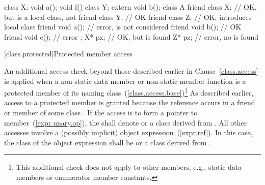 \begin{codeblock}
class X;
void a();
void f() {
  class Y;
  extern void b();
  class A {
  friend class X;   // OK, but  is a local class, not 
  friend class Y;   // OK
  friend class Z;   // OK, introduces local class 
  friend void a();  // error,  is not considered
  friend void b();  // OK
  friend void c();  // error
  };
  X* px;            // OK, but  is found
  Z* pz;            // error, no  is found
}
\end{codeblock}
\exitexample

[class.protected]{Protected member access}
%

\pnum
An additional access check beyond those described earlier in Clause~\ref{class.access}
is applied when a non-static data member or non-static member function is a
protected member of its naming class~(\ref{class.access.base})\footnote{This
additional check does not apply to other members,
e.g., static data members or enumerator member constants.}
As described earlier, access to a protected member is granted because the
reference occurs in a friend or member of some class . If the access is
to form a pointer to member~(\ref{expr.unary.op}), the
 shall denote  or a class derived from
. All other accesses involve a (possibly implicit) object
expression~(\ref{expr.ref}). In this case, the class of the object expression shall be
 or a class derived from .
\enterexample

